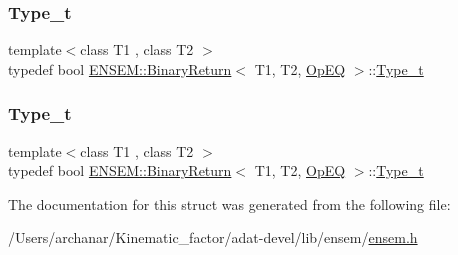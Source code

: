 \mbox{\label{structENSEM_1_1BinaryReturn_3_01T1_00_01T2_00_01OpEQ_01_4_a78e18e010c85e91abd8944d6f76af63d}} 
\subsubsection{\texorpdfstring{Type\_t}{Type\_t}\hspace{0.1cm}{\footnotesize\ttfamily [2/3]}}
{\footnotesize\ttfamily template$<$class T1 , class T2 $>$ \\
typedef bool \mbox{\hyperlink{structENSEM_1_1BinaryReturn}{E\+N\+S\+E\+M\+::\+Binary\+Return}}$<$ T1, T2, \mbox{\hyperlink{structENSEM_1_1OpEQ}{Op\+EQ}} $>$\+::\mbox{\hyperlink{structENSEM_1_1BinaryReturn_3_01T1_00_01T2_00_01OpEQ_01_4_a78e18e010c85e91abd8944d6f76af63d}{Type\+\_\+t}}}

\mbox{\label{structENSEM_1_1BinaryReturn_3_01T1_00_01T2_00_01OpEQ_01_4_a78e18e010c85e91abd8944d6f76af63d}} 
\subsubsection{\texorpdfstring{Type\_t}{Type\_t}\hspace{0.1cm}{\footnotesize\ttfamily [3/3]}}
{\footnotesize\ttfamily template$<$class T1 , class T2 $>$ \\
typedef bool \mbox{\hyperlink{structENSEM_1_1BinaryReturn}{E\+N\+S\+E\+M\+::\+Binary\+Return}}$<$ T1, T2, \mbox{\hyperlink{structENSEM_1_1OpEQ}{Op\+EQ}} $>$\+::\mbox{\hyperlink{structENSEM_1_1BinaryReturn_3_01T1_00_01T2_00_01OpEQ_01_4_a78e18e010c85e91abd8944d6f76af63d}{Type\+\_\+t}}}



The documentation for this struct was generated from the following file\+:\begin{DoxyCompactItemize}
\item 
/\+Users/archanar/\+Kinematic\+\_\+factor/adat-\/devel/lib/ensem/\mbox{\hyperlink{adat-devel_2lib_2ensem_2ensem_8h}{ensem.\+h}}\end{DoxyCompactItemize}
